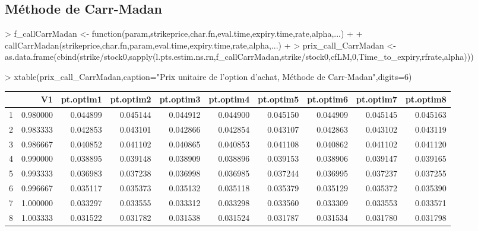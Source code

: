 \documentclass[letter]{report}
\begin{document}
\subsection{Méthode de Carr-Madan}
\begin{Schunk}
\begin{Sinput}
> 	f_callCarrMadan <- function(param,strikeprice,char.fn,eval.time,expiry.time,rate,alpha,...)
+ 	{
+ 		callCarrMadan(strikeprice,char.fn,param,eval.time,expiry.time,rate,alpha,...)
+ 	}
> 	prix_call_CarrMadan <- as.data.frame(cbind(strike/stock0,sapply(l.pts.estim.ns.rn,f_callCarrMadan,strike/stock0,cfLM,0,Time_to_expiry,rfrate,alpha)))
\end{Sinput}
\end{Schunk}

\begin{Schunk}
\begin{Sinput}
> 	xtable(prix_call_CarrMadan,caption="Prix unitaire de l'option d'achat, Méthode de Carr-Madan",digits=6)
\end{Sinput}
% latex table generated in R 3.0.2 by xtable 1.7-4 package
% Mon Oct 13 12:28:07 2014
\begin{table}[ht]
\centering
\begin{tabular}{rrrrrrrrrr}
  \hline
 & V1 & pt.optim1 & pt.optim2 & pt.optim3 & pt.optim4 & pt.optim5 & pt.optim6 & pt.optim7 & pt.optim8 \\ 
  \hline
1 & 0.980000 & 0.044899 & 0.045144 & 0.044912 & 0.044900 & 0.045150 & 0.044909 & 0.045145 & 0.045163 \\ 
  2 & 0.983333 & 0.042853 & 0.043101 & 0.042866 & 0.042854 & 0.043107 & 0.042863 & 0.043102 & 0.043119 \\ 
  3 & 0.986667 & 0.040852 & 0.041102 & 0.040865 & 0.040853 & 0.041108 & 0.040862 & 0.041102 & 0.041120 \\ 
  4 & 0.990000 & 0.038895 & 0.039148 & 0.038909 & 0.038896 & 0.039153 & 0.038906 & 0.039147 & 0.039165 \\ 
  5 & 0.993333 & 0.036983 & 0.037238 & 0.036998 & 0.036985 & 0.037244 & 0.036995 & 0.037237 & 0.037255 \\ 
  6 & 0.996667 & 0.035117 & 0.035373 & 0.035132 & 0.035118 & 0.035379 & 0.035129 & 0.035372 & 0.035390 \\ 
  7 & 1.000000 & 0.033297 & 0.033555 & 0.033312 & 0.033298 & 0.033560 & 0.033309 & 0.033553 & 0.033571 \\ 
  8 & 1.003333 & 0.031522 & 0.031782 & 0.031538 & 0.031524 & 0.031787 & 0.031534 & 0.031780 & 0.031798 \\ 

\end{tabular}
\end{table}
\end{Schunk}
\end{document}
